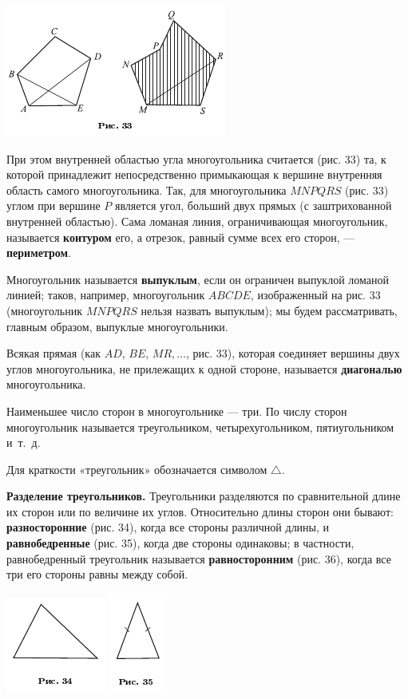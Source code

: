 \documentclass[oneside]{book}
\begin{document}
\includegraphics{pics/ris-33}

При этом внутренней областью угла многоугольника считается (рис. 33) та, к которой принадлежит непосредственно примыкающая к вершине внутренняя область самого многоугольника.
Так, для многоугольника $MNPQRS$ (рис. 33) углом при вершине $P$ является угол, больший двух прямых (с заштрихованной внутренней областью).
Сама ломаная линия, ограничивающая многоугольник, называется \textbf{контуром} его, а отрезок, равный сумме всех его сторон, — \textbf{периметром}.

Многоугольник называется \textbf{выпуклым}, если он ограничен выпуклой ломаной линией;
таков, например, многоугольник $ABCDE$, изображенный на рис. 33 (многоугольник $MNPQRS$ нельзя назвать выпуклым);
мы будем рассматривать, главным образом, выпуклые многоугольники.

Всякая прямая (как $AD$, $BE$, $MR,\dots$, рис. 33), которая соединяет вершины двух углов многоугольника, не прилежащих к одной стороне, называется \textbf{диагональю} многоугольника.

Наименьшее число сторон в многоугольнике — три.
По числу сторон многоугольник называется треугольником, четырехугольником, пятиугольником и~т.~д.

Для краткости «треугольник» обозначается символом $\triangle$.

\textbf{Разделение треугольников.}
Треугольники разделяются по сравнительной длине их сторон или по величине их углов.
Относительно длины сторон они бывают:
\textbf{разносторонние} (рис. 34), когда все стороны различной длины, и \textbf{равнобедренные} (рис. 35), когда две стороны одинаковы;
в частности, равнобедренный треугольник называется \textbf{равносторонним} (рис. 36), когда все три его стороны равны между собой.

\includegraphics{pics/ris-34}
\includegraphics{pics/ris-35}
\end{document}
